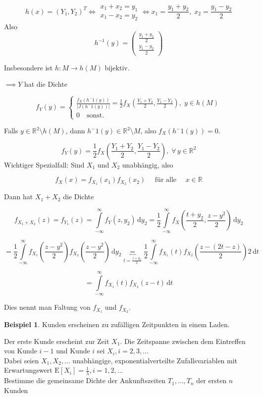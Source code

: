 \documentclass[12pt, a4paper]{article}
\newcommand{\E}{\mbox{I\negthinspace E}}
\theoremstyle{plain}
\theoremstyle{definition}
\newtheorem{beispiel}[thm]{Beispiel}
\newcommand{\R}{\mathbb{R}}
\newcommand{\1}{\mathds{1}}
\renewcommand{\E}{\mathrm{E}}
\providecommand{\abs}[1]{\lvert#1\rvert}
\renewcommand{\d}{\,\mathrm{d}}
\providecommand{\mtext}[1]{\quad \text{#1} \quad}
\begin{document}
\[  h(x) = (Y_1, Y_2)^T  \iff \begin{matrix} x_1 + x_2 = y_1 \\ x_1 - x_2 = y_2 \end{matrix}  \iff x_1 = \frac{y_1 + y_2}{2}, \; x_2 = \frac{y_1 - y_2}{2}   \]
Also 
\[  h^{-1}(y) = \begin{pmatrix} \frac{y_1 + y_2}{2} \\ \frac{y_1 - y_2}{2} \end{pmatrix}     \]

Insbesondere ist $h:M \to h(M)$ bijektiv.

$\implies Y$ hat die Dichte

\[ f_Y (y) = \begin{cases}  \frac{f_X (h^-1 (y))}{\abs{J(h^-1 (y))}} = \frac{1}{2}f_X (\frac{Y_1 + Y_2}{2}, \frac{Y_1 - Y_2}{2}), \; y \in h(M) \\ 0 \mtext{sonst.}  \end{cases}      \]

Falls $y \in \R^2 \setminus h(M)$, dann $h^-1 (y) \in \R^2 \setminus M$, also $f_X (h^-1 (y)) = 0$.

\[ f_Y (y) = \frac{1}{2} f_X \left(\frac{Y_1 + Y_2}{2}, \frac{Y_1 - Y_2}{2}\right), \; \forall \, y \in \R^2      \]
Wichtiger Spezialfall: Sind $X_1$ und $X_2$ unabhängig, also 

\[ f_X (x) = f_{X_1}(x_1) f_{X_2}(x_2) \mtext{ für alle } x \in \R      \]

Dann hat $X_1 + X_2$ die Dichte 

\[   f_{X_1 + X_2} (z) = f_{Y_1} (z) = \int\limits_{-\infty}^{\infty} f_Y (z, y_2) \d y_2  = \frac{1}{2} \int\limits_{-\infty}^{\infty} f_X \left(\frac{t + y_2}{2} , \frac{z - y^2}{2} \right) \d y_2  \]

\[   = \frac{1}{2} \int\limits_{-\infty}^{\infty} f_{X_1} \left(\frac{z - y^2}{2}\right) f_{X_2}\left(\frac{z-y^2}{2}\right) \d y_2 \underbrace{=}_{t = \frac{z + y_2}{2}}  \frac{1}{2} \int\limits_{-\infty}^{\infty} f_{X_1} (t) f_{X_2} \left(\frac{z - (2t - z)}{2}\right) 2 \d t  \]

\[  =  \int\limits_{-\infty}^{\infty} f_{X_1} (t) f_{X_2}(z-t) \d t    \]

Dies nennt man Faltung von $f_{X_1}$ und $f_{X_2}$.



\begin{beispiel} Kunden erscheinen zu zufälligen Zeitpunkten in einem Laden. \end{beispiel} Der erste Kunde erscheint zur Zeit \(X_1\). Die Zeitspanne zwischen dem Eintreffen von Kunde \(i-1\) und Kunde \(i\) sei \(X_i, i=2,3,\dots\)\\
Dabei seien \(X_1,X_2,\dots\) unabhängige, exponentialverteilte Zufallsvariablen mit Erwartungswert \(\E[X_i] = \frac{1}{\lambda}, i=1,2,\dots\)\\
Bestimme die gemeinsame Dichte der Ankunftszeiten \(T_1,\dots,T_n\) der ersten \(n\) Kunden\\
\end{document}

